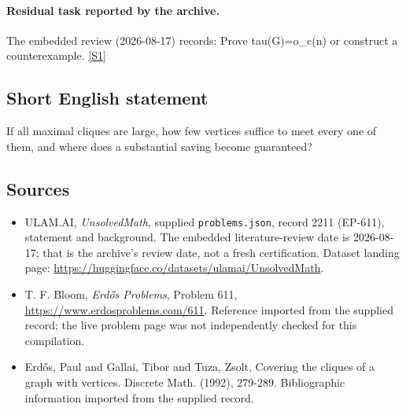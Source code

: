 \documentclass[11pt,a4paper]{article}
\newcommand{\sref}[2]{\hyperlink{source:#1:#2}{[S#2]}}
\begin{document}
\paragraph{Residual task reported by the archive.}

The embedded review (2026-08-17) records: Prove tau(G)=o\_c(n) or construct a counterexample. \sref{2211}{1}

\subsection{Short English statement}

If all maximal cliques are large, how few vertices suffice to meet every one of them, and where does a substantial saving become guaranteed?

\subsection{Sources}

{\small

\begin{itemize}

\item[\hypertarget{source:2211:1}{S1}] ULAM.AI, \emph{UnsolvedMath}, supplied \texttt{problems.json}, record 2211 (EP-611), statement and background. The embedded literature-review date is 2026-08-17; that is the archive’s review date, not a fresh certification. Dataset landing page: \url{https://huggingface.co/datasets/ulamai/UnsolvedMath}.

\item[\hypertarget{source:2211:2}{S2}] T. F. Bloom, \emph{Erdős Problems}, Problem 611, \url{https://www.erdosproblems.com/611}. Reference imported from the supplied record; the live problem page was not independently checked for this compilation.

\item[\hypertarget{source:2211:3}{S3}] Erd\H{o}s, Paul and Gallai, Tibor and Tuza, Zsolt, Covering the cliques of a graph with vertices. Discrete Math. (1992), 279-289. Bibliographic information imported from the supplied record.

\end{itemize}

}

\label{end:2211}
\end{document}
